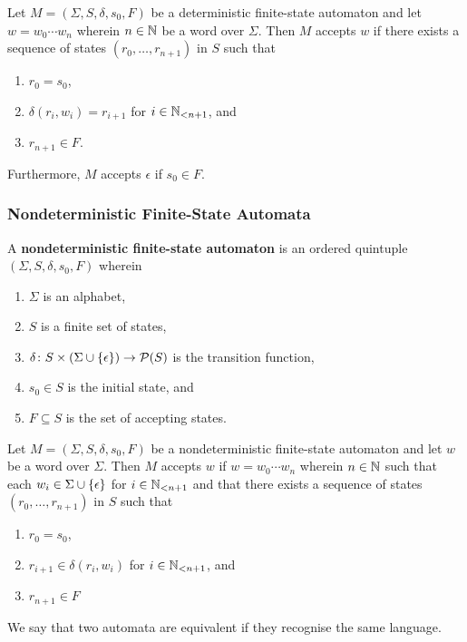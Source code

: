 Let \(M = (\Sigma, S, \delta, s_0, F)\) be a deterministic finite-state
automaton and let \(w = w_0 \cdots w_n\) wherein \(n \in \setnat\) be a word
over \(\Sigma\).  Then \(M\) accepts \(w\) if there exists a sequence of states
\((r_0, \ldots, r_{n + 1})\) in \(S\) such that
\begin{enumerate}
    \item \(r_0 = s_0\),
    \item \(\delta(r_i, w_i) = r_{i + 1}\) for \(i \in \Nln[n + 1]\), and
    \item \(r_{n + 1} \in F\).
\end{enumerate}
Furthermore, \(M\) accepts \(\epsilon\) if \(s_0 \in F\).

\subsubsection{Nondeterministic Finite-State Automata}

\Bdf
    A {\bf nondeterministic finite-state automaton} is an ordered quintuple
    \((\Sigma, S, \delta, s_0, F)\) wherein
    \begin{enumerate}
        \item \(\Sigma\) is an alphabet,
        \item \(S\) is a finite set of states,
        \item \(\map{\delta}{S \times (\Sigma \cup \set{\epsilon})}{\pow(S)}\)
        is the transition function,
        \item \(s_0 \in S\) is the initial state, and
        \item \(F \subseteq S\) is the set of accepting states.
    \end{enumerate}
\Edf

Let \(M = (\Sigma, S, \delta, s_0, F)\) be a nondeterministic finite-state
automaton and let \(w\) be a word over \(\Sigma\). Then \(M\) accepts \(w\) if
\(w = w_0 \cdots w_n\) wherein \(n \in \setnat\) such that each \(w_i \in \Sigma
\cup \set{\epsilon}\) for \(i \in \Nln[n + 1]\) and that there exists a sequence
of states \((r_0, \ldots, r_{n + 1})\) in \(S\) such that
\begin{enumerate}
    \item \(r_0 = s_0\),
    \item \(r_{i + 1} \in \delta(r_i, w_i)\) for \(i \in \Nln[n + 1]\), and
    \item \(r_{n + 1} \in F\)
\end{enumerate}

We say that two automata are equivalent if they recognise the same language.

